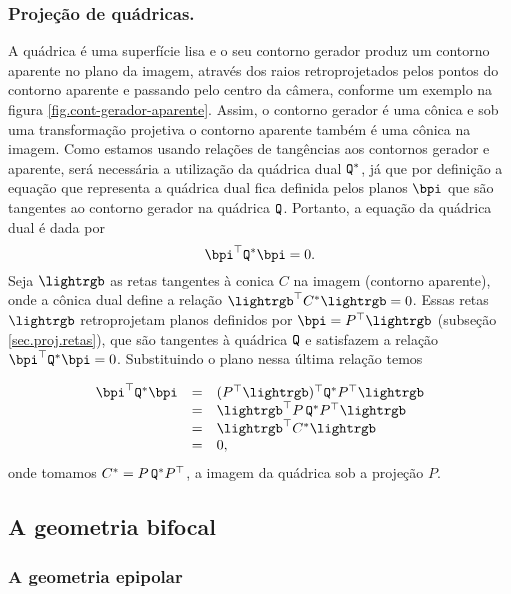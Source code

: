 \subsubsection*{Projeção de quádricas.}
A quádrica é uma superfície lisa  e o seu contorno gerador produz um contorno aparente no plano da imagem, através dos raios retroprojetados pelos pontos do contorno aparente e passando pelo centro da câmera, conforme um exemplo na figura \ref{fig.cont-gerador-aparente}. Assim, o contorno gerador é uma cônica e sob uma transformação projetiva o contorno aparente também é uma cônica na imagem. Como estamos usando relações de tangências aos contornos gerador e aparente, será necessária a utilização da quádrica dual	${\tt Q}^*$, já que por definição a equação que representa a quádrica dual fica definida pelos planos $\bpi$ que são tangentes ao contorno gerador na quádrica ${\tt Q}$. Portanto, a equação da quádrica dual é dada por
\begin{equation*}
\bpi^\top {\tt Q}^*\bpi=0.
\end{equation*}
Seja $\lightrgb$ as retas tangentes à conica $C$ na imagem (contorno aparente), onde a cônica dual define a relação $\lightrgb^\top C^*\lightrgb=0$. Essas retas $\lightrgb$ retroprojetam planos definidos por $\bpi=P^\top\lightrgb$ (subseção \ref{sec.proj.retas}), que são tangentes à quádrica ${\tt Q}$ e satisfazem a relação $\bpi^\top {\tt Q}^*\bpi=0$. Substituindo o plano nessa última relação temos

\begin{equation*}
\begin{array}{rcl}
\bpi^\top {\tt Q}^*\bpi&=&(P^\top\lightrgb)^\top {\tt Q}^*P^\top\lightrgb\\
&=&\lightrgb^\top P\,{\tt Q}^*P^\top\lightrgb\\
&=&\lightrgb^\top C^*\lightrgb\\
&=&0,
\end{array}
\end{equation*}
onde tomamos $C^*=P\,{\tt Q}^*P^\top$, a imagem da quádrica sob a projeção $P$.

\subsection{A geometria bifocal}

\subsubsection{A geometria epipolar}

